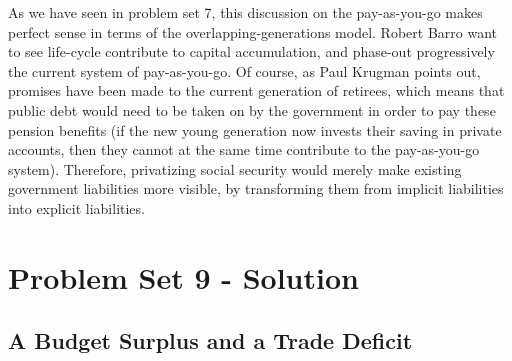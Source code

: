 \documentclass[]{book}
\begin{document}
As we have seen in problem set 7, this discussion on the pay-as-you-go
makes perfect sense in terms of the overlapping-generations model.
Robert Barro want to see life-cycle contribute to capital accumulation,
and phase-out progressively the current system of pay-as-you-go. Of
course, as Paul Krugman points out, promises have been made to the
current generation of retirees, which means that public debt would need
to be taken on by the government in order to pay these pension benefits
(if the new young generation now invests their saving in private
accounts, then they cannot at the same time contribute to the
pay-as-you-go system). Therefore, privatizing social security would
merely make existing government liabilities more visible, by
transforming them from implicit liabilities into explicit liabilities.

\chapter{Problem Set 9 - Solution}\label{pset9-sol}

\section{A Budget Surplus and a Trade
Deficit}\label{a-budget-surplus-and-a-trade-deficit-2}
\end{document}
